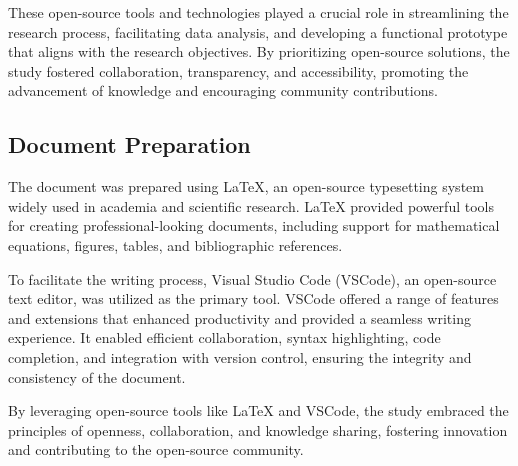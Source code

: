 \documentclass[../main.tex]{subfiles}
\begin{document}
These open-source tools and technologies played a crucial role in streamlining the research process, facilitating data analysis, and developing a functional prototype that aligns with the research objectives. By prioritizing open-source solutions, the study fostered collaboration, transparency, and accessibility, promoting the advancement of knowledge and encouraging community contributions.

\subsection{Document Preparation}

The document was prepared using LaTeX, an open-source typesetting system widely used in academia and scientific research. LaTeX provided powerful tools for creating professional-looking documents, including support for mathematical equations, figures, tables, and bibliographic references.

To facilitate the writing process, Visual Studio Code (VSCode), an open-source text editor, was utilized as the primary tool. VSCode offered a range of features and extensions that enhanced productivity and provided a seamless writing experience. It enabled efficient collaboration, syntax highlighting, code completion, and integration with version control, ensuring the integrity and consistency of the document.

By leveraging open-source tools like LaTeX and VSCode, the study embraced the principles of openness, collaboration, and knowledge sharing, fostering innovation and contributing to the open-source community.
\end{document}
